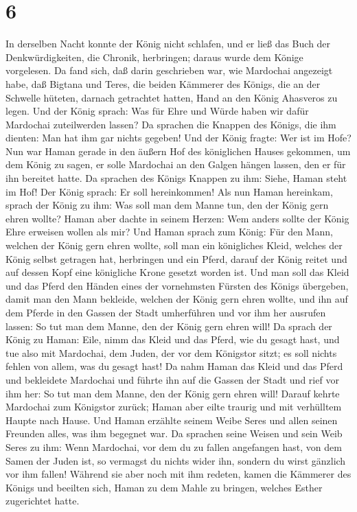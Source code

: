 \hypertarget{section-5}{%
\section{6}\label{section-5}}

 In derselben Nacht konnte der König nicht schlafen, und
er ließ das Buch der Denkwürdigkeiten, die Chronik, herbringen; daraus
wurde dem Könige vorgelesen.  Da fand sich, daß darin
geschrieben war, wie Mardochai angezeigt habe, daß Bigtana und Teres,
die beiden Kämmerer des Königs, die an der Schwelle hüteten, darnach
getrachtet hatten, Hand an den König Ahasveros zu legen. 
Und der König sprach: Was für Ehre und Würde haben wir dafür Mardochai
zuteilwerden lassen? Da sprachen die Knappen des Königs, die ihm
dienten: Man hat ihm gar nichts gegeben!  Und der König
fragte: Wer ist im Hofe? Nun war Haman gerade in den äußern Hof des
königlichen Hauses gekommen, um dem König zu sagen, er solle Mardochai
an den Galgen hängen lassen, den er für ihn bereitet hatte.
 Da sprachen des Königs Knappen zu ihm: Siehe, Haman steht
im Hof! Der König sprach: Er soll hereinkommen!  Als nun
Haman hereinkam, sprach der König zu ihm: Was soll man dem Manne tun,
den der König gern ehren wollte? Haman aber dachte in seinem Herzen: Wem
anders sollte der König Ehre erweisen wollen als mir?  Und
Haman sprach zum König: Für den Mann, welchen der König gern ehren
wollte,  soll man ein königliches Kleid, welches der König
selbst getragen hat, herbringen und ein Pferd, darauf der König reitet
und auf dessen Kopf eine königliche Krone gesetzt worden ist.
 Und man soll das Kleid und das Pferd den Händen eines der
vornehmsten Fürsten des Königs übergeben, damit man den Mann bekleide,
welchen der König gern ehren wollte, und ihn auf dem Pferde in den
Gassen der Stadt umherführen und vor ihm her ausrufen lassen: So tut man
dem Manne, den der König gern ehren will!  Da sprach der
König zu Haman: Eile, nimm das Kleid und das Pferd, wie du gesagt hast,
und tue also mit Mardochai, dem Juden, der vor dem Königstor sitzt; es
soll nichts fehlen von allem, was du gesagt hast!  Da
nahm Haman das Kleid und das Pferd und bekleidete Mardochai und führte
ihn auf die Gassen der Stadt und rief vor ihm her: So tut man dem Manne,
den der König gern ehren will!  Darauf kehrte Mardochai
zum Königstor zurück; Haman aber eilte traurig und mit verhülltem Haupte
nach Hause.  Und Haman erzählte seinem Weibe Seres und
allen seinen Freunden alles, was ihm begegnet war. Da sprachen seine
Weisen und sein Weib Seres zu ihm: Wenn Mardochai, vor dem du zu fallen
angefangen hast, von dem Samen der Juden ist, so vermagst du nichts
wider ihn, sondern du wirst gänzlich vor ihm fallen! 
Während sie aber noch mit ihm redeten, kamen die Kämmerer des Königs und
beeilten sich, Haman zu dem Mahle zu bringen, welches Esther zugerichtet
hatte.

